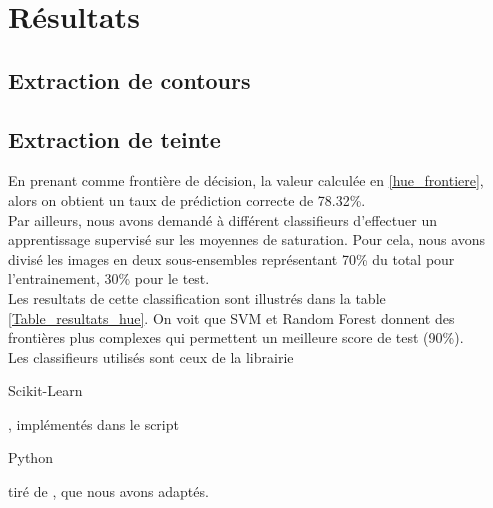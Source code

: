 \documentclass{book}
\begin{document}
\chapter{Résultats}
\section{Extraction de contours}
\section{Extraction de teinte}
En prenant comme frontière de décision, la valeur calculée en \ref{hue_frontiere}, alors on obtient un taux de prédiction correcte de 78.32\%.\\
Par ailleurs, nous avons demandé à différent classifieurs d'effectuer un apprentissage supervisé sur les moyennes de saturation. Pour cela, nous avons divisé les images
en deux sous-ensembles représentant 70\% du total pour l'entrainement, 30\% pour le test.\\
Les resultats de cette classification sont illustrés dans la table \ref{Table_resultats_hue}. On voit que SVM et Random Forest donnent des frontières plus complexes qui permettent
un meilleure score de test (90\%).\\
Les classifieurs utilisés sont ceux de la librairie \begin{itshape}Scikit-Learn\end{itshape}, implémentés dans le script 
\begin{itshape}Python\end{itshape} tiré de \cite{scikit_bench}, que nous avons adaptés.
\end{document}
